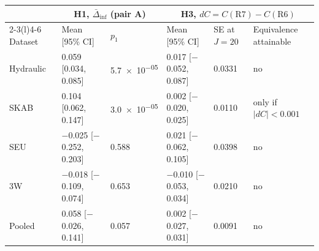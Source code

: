\begin{tabular}{@{}l l l l l >{\raggedright\arraybackslash}p{1.9cm}@{}}
\toprule
& \multicolumn{2}{c}{H1, $\bar\Delta_{\mathrm{inf}}$ (pair A)} & \multicolumn{3}{c}{H3, $dC=C(\mathrm{R7})-C(\mathrm{R6})$} \\
\cmidrule(lr){2-3}\cmidrule(l){4-6}
Dataset & Mean [95\% CI] & $p_1$ & Mean [95\% CI] & SE at $J=20$ & Equivalence attainable \\
\midrule
Hydraulic & 0.059 [0.034, 0.085] & \num{5.7e-05} & 0.017 [$-$0.052, 0.087] & 0.0331 & no \\
SKAB & 0.104 [0.062, 0.147] & \num{3.0e-05} & 0.002 [$-$0.020, 0.025] & 0.0110 & only if $|dC|<0.001$ \\
SEU & $-$0.025 [$-$0.252, 0.203] & 0.588 & 0.021 [$-$0.062, 0.105] & 0.0398 & no \\
3W & $-$0.018 [$-$0.109, 0.074] & 0.653 & $-$0.010 [$-$0.053, 0.034] & 0.0210 & no \\
\midrule
Pooled & 0.058 [$-$0.026, 0.141] & 0.057 & 0.002 [$-$0.027, 0.031] & 0.0091 & no \\
\bottomrule
\end{tabular}
